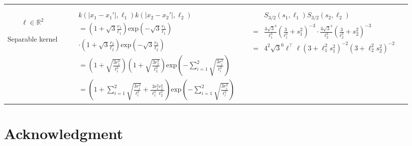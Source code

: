 \documentclass[]{interact}
\theoremstyle{plain}%
\theoremstyle{definition}
\theoremstyle{remark}
\begin{document}
\begin{landscape}
\begin{table}[H]
\begin{center}
\begin{tabular}{|c|c|c|c|}
       & \multicolumn{1}{|p{6.2cm}|}{\small

       } \\  
       \vspace{-10mm}\\
       \cline{1-3}
       
       \multicolumn{1}{|p{1.5cm}|}{
       \vspace{1mm}
       $\bm{\ell} \in \mathbb{R}^2$
       
       {Separable kernel} 
       }
       
        & \multicolumn{1}{|p{7.2cm}|}{\small
         \begin{eqnarray*}
		&&k(|x_1-x_1'|,\ell_1)k(|x_2-x_2'|,\ell_2) \\
		&&= \left(1+\sqrt{3}\frac{r_1}{\ell_1}\right)\mathrm{exp}\left(-\sqrt{3}\frac{r_1}{\ell_1} \right)\\
		&&\cdot \left(1+\sqrt{3}\frac{r_2}{\ell_2}\right)\mathrm{exp}\left(-\sqrt{3}\frac{r_2}{\ell_2} \right) \\
		&&= \left(1+\sqrt{\frac{3r_1^2}{\ell_1^2}}\right)\left(1+\sqrt{\frac{3r_2^2}{\ell_2^2}}\right)\mathrm{exp}\left(-\sum_{i=1}^{2}\sqrt{\frac{3r_i^2}{\ell_i^2}} \right) \\
		&&= \left(1+\sum_{i=1}^{2}\sqrt{\frac{3r_i^2}{\ell_i^2}}+\frac{3r_1^2r_2^2}{\ell_1^2\ell_2^2}\right)\mathrm{exp}\left(-\sum_{i=1}^{2}\sqrt{\frac{3r_i^2}{\ell_i^2}} \right)
         \end{eqnarray*}
       }
       
       & \multicolumn{1}{|p{7.2cm}|}{\small
         \begin{eqnarray*}
         &&S_{3/2}(s_1,\ell_1)S_{3/2}(s_2,\ell_2) \\
		&=& \frac{4\sqrt{3}^3}{\ell_1^3}\left(\frac{3}{\ell_1^2}+s_1^2 \right)^{-3} \cdot \frac{4\sqrt{3}^3}{\ell_2^3}\left(\frac{3}{\ell_2^2}+s_2^2 \right)^{-3}\\ 
		&=& 4^2\sqrt{3}^6\bm{\ell}^\top\bm{\ell}\left(3+\ell_1^2s_1^2 \right)^{-2} \left(3+\ell_2^2s_2^2 \right)^{-2}\\        
		\end{eqnarray*}        
       } 

       & \multicolumn{1}{|p{6.2cm}|}{\small

       } \\ 
       
       \hline
    \end{tabular}
  \end{center}
\end{table}

\end{landscape}



\newpage
\vspace{2mm}
\section*{Acknowledgment}



\end{document}
